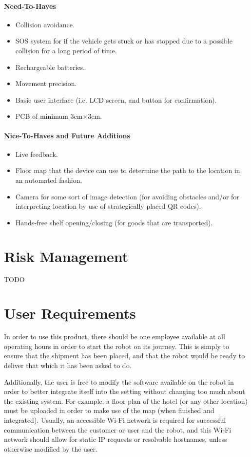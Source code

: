 \documentclass[11pt]{article}
\begin{document}
\paragraph{Need-To-Haves}
\begin{itemize}
\item{Collision avoidance.}
\item{SOS system for if the vehicle gets stuck or has stopped due to a possible collision for a long period of time.}
\item{Rechargeable batteries.}
\item{Movement precision.}
\item{Basic user interface (i.e. LCD screen, and button for confirmation).}
\item{PCB of minimum 3cm$\times$3cm.}
\end{itemize}
\paragraph{Nice-To-Haves and Future Additions}
\begin{itemize}
\item{Live feedback.}
\item{Floor map that the device can use to determine the path to the location in an automated fashion.}
\item{Camera for some sort of image detection (for avoiding obstacles and/or for interpreting location by use of strategically placed QR codes).}
\item{Hands-free shelf opening/closing (for goods that are transported).}
\end{itemize}
\newpage
\section{Risk Management}
TODO
\newpage
\section{User Requirements}
In order to use this product, there should be one employee available at all operating hours in order to start the robot on its journey. This is simply to ensure that the shipment has been placed, and that the robot would be ready to deliver that which it has been asked to do.

Additionally, the user is free to modify the software available on the robot in order to better integrate itself into the setting without changing too much about the existing system. For example, a floor plan of the hotel (or any other location) must be uploaded in order to make use of the map (when finished and integrated). Usually, an accessible Wi-Fi network is required for successful communication between the customer or user and the robot, and this Wi-Fi network should allow for static IP requests or resolvable hostnames, unless otherwise modified by the user.
\end{document}
